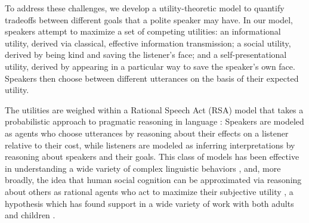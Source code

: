 \documentclass[12pt]{article}
\begin{document}

To address these challenges, we develop a utility-theoretic model to
quantify tradeoffs between different goals that a polite speaker may
have. In our model, speakers attempt to maximize a set of competing
utilities: an informational utility, derived via classical, effective
information transmission; a social utility, derived by being kind and
saving the listener's face; and a self-presentational utility, derived
by appearing in a particular way to save the speaker's own face.
Speakers then choose between different utterances on the basis of their
expected utility.

The utilities are weighed within a Rational Speech Act (RSA) model that
takes a probabilistic approach to pragmatic reasoning in language \cite{frank2012, goodman2016}: 
Speakers are modeled as agents
who choose utterances by reasoning about their effects on a listener
relative to their cost, while listeners are modeled as inferring
interpretations by reasoning about speakers and their goals. This class
of models has been effective in understanding a wide variety of complex
linguistic behaviors \cite{lassiter2017adjectival, kao2014, kao2015}, and, 
more broadly, the idea that human social cognition can
be approximated via reasoning about others as rational agents who act to
maximize their subjective utility \cite{baker2009action}, a
hypothesis which has found support in a wide variety of work with both
adults and children \cite{jara2016naive, liu2017ten}.

\end{document}
